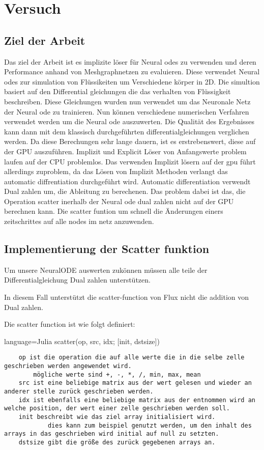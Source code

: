 
\chapter{Versuch}

\section{Ziel der Arbeit}

Das ziel der Arbeit ist es implizite löser für Neural odes zu verwenden 
und deren Performance anhand von Meshgraphnetzen zu evaluieren. 
Diese verwendet Neural odes zur simulation von Flüssikeiten um Verschiedene körper in 2D.
Die simultion basiert auf den Differential gleichungen die das verhalten von Flüssigkeit beschreiben.
Diese Gleichungen wurden nun verwendet um das Neuronale Netz der Neural ode zu trainieren.
Nun können verschiedene numerischen Verfahren verwendet werden um die Neural ode auszuwerten.
Die Qualität des Ergebnisses kann dann mit dem klassisch durchgeführten differentialgleichungen verglichen werden.
Da diese Berechungen sehr lange dauern, ist es erstrebenswert, diese auf der GPU auszuführen.
Implizit und Explicit Löser von Anfangswerte problem laufen auf der CPU problemlos.
Das verwenden Implizit lösern auf der gpu führt allerdings zuproblem, da das Lösen von Implizit Methoden 
verlangt das automatic diffrentiation durchgeführt wird.
Automatic differentiation verwendt Dual zahlen um, die Ableitung zu berechenen.
Das problem dabei ist das, die Operation scatter inerhalb der Neural ode dual zahlen nicht auf der GPU 
berechnen kann.
Die scatter funtion um schnell die Änderungen einers zeitschrittes auf alle nodes im netz anzuwenden.

\section{Implementierung der Scatter funktion}

Um unsere NeuralODE auswerten zukönnen müssen alle teile der Differentialgleichung Dual zahlen unterstützen.

In diesem Fall unterstützt die scatter-function von Flux nicht die addition von Dual zahlen.

Die scatter function ist wie folgt definiert:

\begin{listing}{language=Julia}
	scatter(op, src, idx; [init, dstsize])
\end{listing}

\begin{verbatim}
	op ist die operation die auf alle werte die in die selbe zelle geschrieben werden angewendet wird.
		mögliche werte sind +, -, *, /, min, max, mean
	src ist eine beliebige matrix aus der wert gelesen und wieder an anderer stelle zurück geschrieben werden.
	idx ist ebenfalls eine beliebige matrix aus der entnommen wird an welche position, der wert einer zelle geschrieben werden soll.
	init beschreibt wie das ziel array initialisiert wird.
			dies kann zum beispiel genutzt werden, um den inhalt des arrays in das geschrieben wird initial auf null zu setzten.
	dstsize gibt die größe des zurück gegebenen arrays an.
\end{verbatim}

